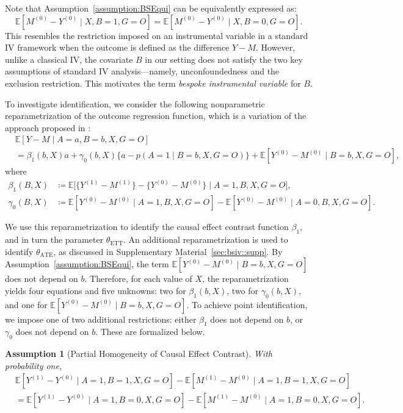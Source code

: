 \documentclass[10pt]{article}
\newtheorem{assumption}{Assumption}
\newcommand{\E}{\mathbb{E}}
\begin{document}
Note that Assumption~\ref{assumption:BSEqui} can be equivalently expressed as:
\[
\E[M^{(0)} - Y^{(0)} \mid X, B=1, G=O] 
= \E[M^{(0)} - Y^{(0)} \mid X, B=0, G=O].
\]
This resembles the restriction imposed on an instrumental variable in a standard IV framework when the outcome is defined as the difference \( Y - M \). However, unlike a classical IV, the covariate \( B \) in our setting does not satisfy the two key assumptions of standard IV analysis---namely, unconfoundedness and the exclusion restriction. This motivates the term \emph{bespoke instrumental variable} for \( B \).

To investigate identification, we consider the following nonparametric reparametrization of the outcome regression function, which is a variation of the approach proposed in \citep{robins1994correcting, tchetgen2013alternative}:
\begin{align*}
&\E[Y - M \mid A = a, B = b, X, G = O] \\
& = \beta_1(b, X) a + \gamma_0(b, X) \{a - p(A = 1 \mid B = b, X, G = O)\} + \E[Y^{(0)} - M^{(0)} \mid B = b, X, G = O],
\end{align*}
where
\begin{align*}
\beta_1(B, X) &\coloneqq \E\big[ \{Y^{(1)} - M^{(1)}\} - \{Y^{(0)} - M^{(0)}\} \mid A = 1, B, X, G = O \big], \\
\gamma_0(B, X) &\coloneqq \E[Y^{(0)} - M^{(0)} \mid A = 1, B, X, G = O] - \E[Y^{(0)} - M^{(0)} \mid A = 0, B, X, G = O].
\end{align*}

We use this reparametrization to identify the causal effect contrast function \( \beta_1 \), and in turn the parameter \( \theta_{\text{ETT}} \). An additional reparametrization is used to identify \( \theta_{\text{ATE}} \), as discussed in Supplementary Material~\ref{sec:bsiv::supp}.
By Assumption~\ref{assumption:BSEqui}, the term \( \E[Y^{(0)} - M^{(0)} \mid B = b, X, G = O] \) does not depend on \( b \). Therefore, for each value of \( X \), the reparametrization yields four equations and five unknowns: two for \( \beta_1(b, X) \), two for \( \gamma_0(b, X) \), and one for \( \E[Y^{(0)} - M^{(0)} \mid B = b, X, G = O] \). To achieve point identification, we impose one of two additional restrictions: either \( \beta_1 \) does not depend on \( b \), or \( \gamma_0 \) does not depend on \( b \). These are formalized below.

\begin{assumption}[Partial Homogeneity of Causal Effect Contrast]
\label{assumption:homogeneityETT}
With probability one,
\begin{align*}
&\E[Y^{(1)} - Y^{(0)} \mid A = 1, B = 1, X, G = O] - \E[M^{(1)} - M^{(0)} \mid A = 1, B = 1, X, G = O] \\
&= \E[Y^{(1)} - Y^{(0)} \mid A = 1, B = 0, X, G = O] - \E[M^{(1)} - M^{(0)} \mid A = 1, B = 0, X, G = O].
\end{align*}
\end{assumption}
\end{document}
